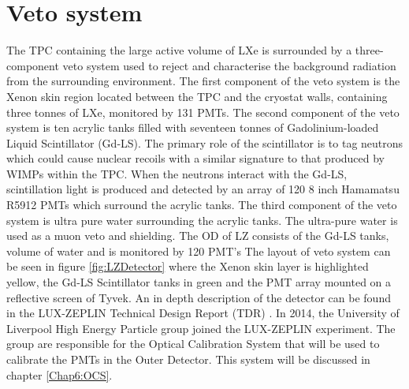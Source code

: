 \section{Veto system}\label{sec:veto}
The TPC containing the large active volume of LXe is surrounded by a three-component veto system used to reject and characterise the background radiation from the surrounding environment. The first component of the veto system is the Xenon skin region located between the TPC and the cryostat walls, containing three tonnes of LXe, monitored by 131 PMTs. The second component of the veto system is ten acrylic tanks filled with seventeen tonnes of Gadolinium-loaded Liquid Scintillator (Gd-LS)\cite{LZTDR}.
The primary role of the scintillator is to tag neutrons which could cause nuclear recoils with a similar signature to that produced by WIMPs within the TPC. When the neutrons interact with the Gd-LS, scintillation light is produced and detected by an array of 120 8 inch Hamamatsu R5912 PMTs which surround the acrylic tanks. The third component of the veto system is ultra pure water surrounding the acrylic tanks. The ultra-pure water is used as a muon veto and shielding. The OD of LZ consists of the Gd-LS tanks, volume of water and is monitored by 120 PMT's
\newline
The layout of veto system can be seen in figure \ref{fig:LZDetector} where the Xenon skin layer is highlighted yellow, the Gd-LS Scintillator tanks in green and the PMT array mounted on a reflective screen of Tyvek\textregistered. An in depth description of the detector can be found in the LUX-ZEPLIN Technical Design Report (TDR) \cite{LZTDR}. In 2014, the University of Liverpool High Energy Particle group joined the LUX-ZEPLIN experiment. The group are responsible for the Optical Calibration System that will be used to calibrate the PMTs in the Outer Detector. This system will be discussed in chapter \ref{Chap6:OCS}. 